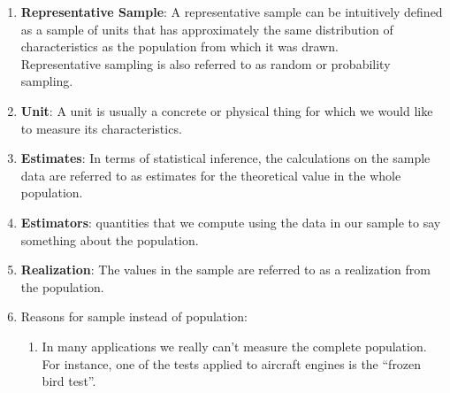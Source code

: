 \begin{enumerate}
    \item \textbf{Representative Sample}\label{Sampling Plans/Representative Sample}:  A representative sample can be intuitively defined as a sample of units that has approximately the same distribution of characteristics as the population from which it was drawn.
    \hfill \cite{statistics/book/Statistics-for-Data-Scientists/Maurits-Kaptein}
    \\
    Representative sampling is also referred to as random or probability sampling.
    \hfill \cite{statistics/book/Statistics-for-Data-Scientists/Maurits-Kaptein}

    \item \textbf{Unit}\label{Sampling Plans/Unit}: A unit is usually a concrete or physical thing for which we would like to measure its characteristics.
    \hfill \cite{statistics/book/Statistics-for-Data-Scientists/Maurits-Kaptein}

    \item \textbf{Estimates}\label{Sampling Plans/Estimates}: In terms of statistical inference, the calculations on the sample data are referred to as estimates for the theoretical value in the whole population.
    \hfill \cite{statistics/book/Statistics-for-Data-Scientists/Maurits-Kaptein}

    \item \textbf{Estimators}\label{Sampling Plans/Estimators}: quantities that we compute using the data in our sample to say something about the population.
    \hfill \cite{statistics/book/Statistics-for-Data-Scientists/Maurits-Kaptein}

    \item \textbf{Realization}\label{Sampling Plans/realization}: The values in the sample are referred to as a realization from the population.
    \hfill \cite{statistics/book/Statistics-for-Data-Scientists/Maurits-Kaptein}

    \vspace{0.5cm}

    \item Reasons for sample instead of population:
    \begin{enumerate}
        \item In many applications we really can’t measure the complete population. For instance, one of the tests applied to aircraft engines is the “frozen bird test”.
        \hfill \cite{statistics/book/Statistics-for-Data-Scientists/Maurits-Kaptein}


\end{enumerate}
\end{enumerate}

